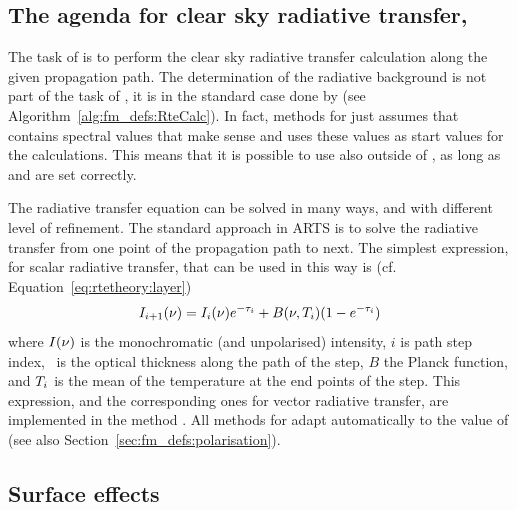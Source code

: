 \subsection{The agenda for clear sky radiative transfer, }
\label{sec:fm_defs:rte_agenda}

The task of  is to perform the clear sky
radiative transfer calculation along the given propagation path. The
determination of the radiative background is not part of the task of
, it is in the standard case done by
 (see Algorithm~\ref{alg:fm_defs:RteCalc}). In
fact, methods for  just assumes that
 contains spectral values that make sense and uses
these values as start values for the calculations. This means that it
is possible to use  also outside of
, as long as  and
 are set correctly.

The radiative transfer equation can be solved in many ways, and with
different level of refinement. The standard approach in ARTS is to
solve the radiative transfer from one point of the propagation path to
next. The simplest expression, for scalar radiative transfer, that can
be used in this way is (cf.  Equation~\ref{eq:rtetheory:layer})
\begin{equation}
  I_{i+1}(\nu) = I_i(\nu)e^{-\tau_{i}} + B(\nu,T_{i})(1-e^{-\tau_{i}})
  \label{eq:fm_defs:rte_step}
\end{equation}
where $I(\nu)$ is the monochromatic (and unpolarised) intensity,
$i$ is path step index, \Oth\ is the optical thickness along the path
of the step, $B$ the Planck function, and $T_{i}$ is the mean of
the temperature at the end points of the step. This expression, and
the corresponding ones for vector radiative transfer, are implemented
in the method . All methods for
 adapt automatically to the value of
 (see also
Section~\ref{sec:fm_defs:polarisation}).



\subsection{Surface effects}
\label{sec:fm_defs:surface}

